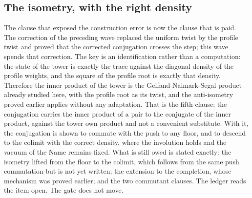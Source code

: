 \documentclass[11pt]{article}
\theoremstyle{definition}\newtheorem{deriv}{Derivation}
\begin{document}
\subsection*{The isometry, with the right density}The clause that exposed the construction error is now the clause that is paid. The correction of the preceding wave replaced the uniform twist by the profile twist and proved that the corrected conjugation crosses the step; this wave spends that correction. The key is an identification rather than a computation: the state of the tower is exactly the trace against the diagonal density of the profile weights, and the square of the profile root is exactly that density. Therefore the inner product of the tower is the Gelfand-Naimark-Segal product already studied here, with the profile root as its twist, and the anti-isometry proved earlier applies without any adaptation. That is the fifth clause: the conjugation carries the inner product of a pair to the conjugate of the inner product, against the tower own product and not a convenient substitute. With it, the conjugation is shown to commute with the push to any floor, and to descend to the colimit with the correct density, where the involution holds and the vacuum of the Name remains fixed. What is still owed is stated exactly: the isometry lifted from the floor to the colimit, which follows from the same push commutation but is not yet written; the extension to the completion, whose mechanism was proved earlier; and the two commutant clauses. The ledger reads the item open. The gate does not move.
\end{document}
